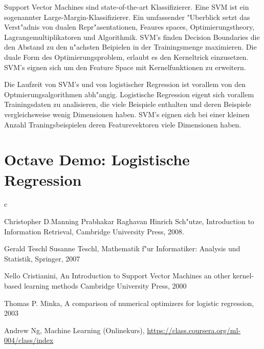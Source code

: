 \documentclass[12pt,a4paper,twoside]{article}
\begin{document}
Support Vector Machines sind state-of-the-art Klassifizierer. Eine SVM ist ein sogenannter Large-Margin-Klassifizierer. Ein umfassender "Uberblick setzt das Verst"adnis von dualen Repr"asentationen, Feaures spaces, Optimierungstheory, Lagrangemultiplikatoren und Algorithmik. SVM's finden Decision Boundaries die den Abstand zu den n"achsten Beipielen in der Trainingsmenge maximieren. Die duale Form des Optimierungsproblem, erlaubt es den Kerneltrick einzusetzen. SVM's eignen sich um den Feature Space mit Kernelfunktionen zu erweitern.

Die Laufzeit von SVM's und von logistischer Regression ist vorallem von den Optmierungsalgorithmen abh"angig. Logistische Regression eigent sich vorallem Trainingsdaten zu analisieren, die viele Beispiele enthalten und deren Beispiele vergleichsweise wenig Dimensionen haben. SVM's eignen sich bei einer kleinen Anzahl Traningsbeispielen deren Featurevektoren viele Dimensionen haben.

\appendix

\section{Octave Demo: Logistische Regression}
\label{sec:code}c



\begin{thebibliography}{99}
Christopher D.Manning Prabhakar Raghavan Hinrich Sch"utze,
Introduction to Information Retrieval,
Cambridge University Press,
2008.

Gerald Teschl Susanne Teschl,
Mathematik f"ur Informatiker: Analysis und Statistik,
Springer,
2007

Nello Cristianini,
An Introduction to Support Vector Machines an other kernel-based learning methods
Cambridge University Press,
2000

Thomas P. Minka,
A comparison of numerical optimizers for logistic regression,
2003

Andrew Ng,
Machine Learning (Onlinekurs),
\url{https://class.coursera.org/ml-004/class/index}

\end{thebibliography}
\end{document}
